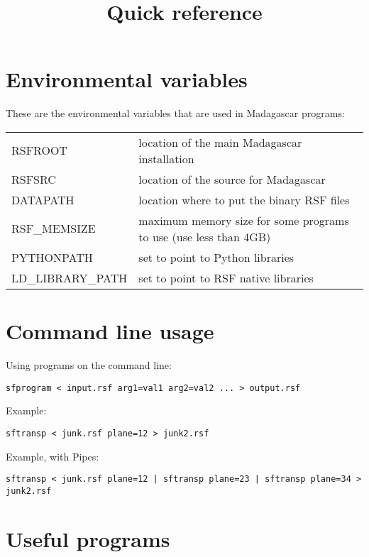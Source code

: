 \title{Quick reference}
\section{Environmental variables}

These are the environmental variables that are used in Madagascar programs:

\begin{tabular}{| l | l |}
    \hline
    RSFROOT & location of the main Madagascar installation \\
    RSFSRC & location of the source for Madagascar \\
    DATAPATH & location where to put the binary RSF files \\
    RSF\_MEMSIZE & maximum memory size for some programs to use (use less than 4GB) \\
    PYTHONPATH & set to point to Python libraries \\
    LD\_LIBRARY\_PATH & set to point to RSF native libraries \\
    \hline
\end{tabular}

\section{Command line usage}

Using programs on the command line:
\begin{verbatim}
sfprogram < input.rsf arg1=val1 arg2=val2 ... > output.rsf
\end{verbatim}
Example:
\begin{verbatim}
sftransp < junk.rsf plane=12 > junk2.rsf
\end{verbatim}
Example, with Pipes:
\begin{verbatim}
sftransp < junk.rsf plane=12 | sftransp plane=23 | sftransp plane=34 > junk2.rsf
\end{verbatim}

\section{Useful programs}

